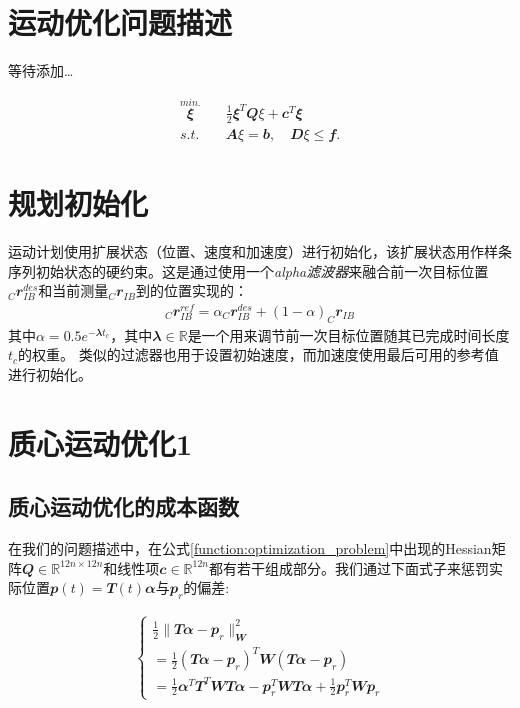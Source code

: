 \section{运动优化问题描述\label{section:motion_plan}}
等待添加\dots

\begin{align}
    \label{function:optimization_problem}
    \overset{min.}{\mathbfit \xi} \quad & \frac{1}{2}{\mathbfit \xi}^T {\mathbfit Q \xi} + {\mathbfit c}^T{\mathbfit \xi} \\
    s.t. \quad & {\mathbfit A\xi} = {\mathbfit  b}, \quad {\mathbfit D\xi} \leq {\mathbfit f}. \tag{16}
\end{align}

\section{规划初始化}
运动计划使用扩展状态（位置、速度和加速度）进行初始化，该扩展状态用作样条序列初始状态的硬约束。这是通过使用一个\emph{alpha滤波器}来融合前一次目标位置$_C\mathbfit{r}_{IB}^{des}$和当前测量$_C\mathbfit{r}_{IB}$到的位置实现的：
\begin{align}
    _C\mathbfit{r}_{IB}^{ref}=\alpha _C\mathbfit{r}_{IB}^{des}+(1-\alpha)_C\mathbfit{r}_{IB}
\end{align}
其中$\alpha=0.5e^{-\mathbfit{\lambda} t_c}$，其中$\mathbfit{\lambda}\in \mathbb{R}$是一个用来调节前一次目标位置随其已完成时间长度$t_c$的权重。
类似的过滤器也用于设置初始速度，而加速度使用最后可用的参考值进行初始化。



\section{质心运动优化1}

\subsection{质心运动优化的成本函数\label{subsection:cost_function}}

在我们的问题描述中，在公式\ref{function:optimization_problem}中出现的Hessian矩阵$\mathbfit{Q}\in\mathbb{R}^{12n\times12n}$和线性项$\mathbfit{c}\in\mathbb{R}^{12n}$都有若干组成部分。我们通过下面式子来惩罚实际位置$\mathbfit{p}(t)=\mathbfit{T}(t)\mathbfit{\alpha}$与$\mathbfit{p}_r$的偏差:

\begin{align}
    \label{function:penalize_deviation}
    \begin{cases}
        \frac{1}{2}\|\mathbfit{T}\mathbfit{\alpha}-\mathbfit{p}_r\|^2_{\mathbfit{W}}\\
        =\frac{1}{2}(\mathbfit{T}\mathbfit{\alpha}-\mathbfit{p}_r)^T \mathbfit{W} (\mathbfit{T}\mathbfit{\alpha}-\mathbfit{p}_r)\\
        =\frac{1}{2}\mathbfit{\alpha}^T\mathbfit{T}^T \mathbfit{W} \mathbfit{T}\mathbfit{\alpha}-\mathbfit{p}_r^T \mathbfit{W} \mathbfit{T}\mathbfit{\alpha}+\frac{1}{2}\mathbfit{p}_r^T \mathbfit{W} \mathbfit{p}_r
    \end{cases}
\end{align}

